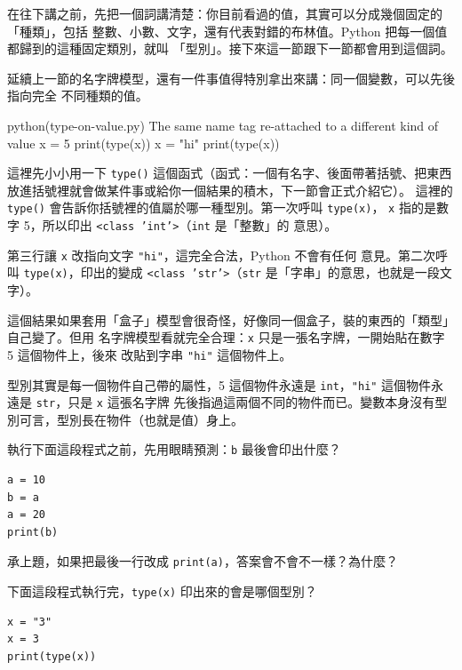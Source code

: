 在往下講之前，先把一個詞講清楚：你目前看過的值，其實可以分成幾個固定的「種類」，包括
整數、小數、文字，還有代表對錯的布林值。Python 把每一個值都歸到的這種固定類別，就叫
「型別」。接下來這一節跟下一節都會用到這個詞。

延續上一節的名字牌模型，還有一件事值得特別拿出來講：同一個變數，可以先後指向完全
不同種類的值。

\begin{example}{python}{(type-on-value.py) The same name tag re-attached to a different kind of value}
x = 5
print(type(x))
x = "hi"
print(type(x))
\end{example}


這裡先小小用一下 \texttt{type()} 這個函式（函式：一個有名字、後面帶著括號、把東西
放進括號裡就會做某件事或給你一個結果的積木，下一節會正式介紹它）。
這裡的
\texttt{type()} 會告訴你括號裡的值屬於哪一種型別。第一次呼叫 \texttt{type(x)}，
\texttt{x} 指的是數字 5，所以印出 \texttt{<class 'int'>}（\texttt{int} 是「整數」的
意思）。

第三行讓 \texttt{x} 改指向文字 \texttt{"hi"}，這完全合法，Python 不會有任何
意見。第二次呼叫 \texttt{type(x)}，印出的變成 \texttt{<class 'str'>}（\texttt{str}
是「字串」的意思，也就是一段文字）。

這個結果如果套用「盒子」模型會很奇怪，好像同一個盒子，裝的東西的「類型」自己變了。但用
名字牌模型看就完全合理：\texttt{x} 只是一張名字牌，一開始貼在數字 5 這個物件上，後來
改貼到字串 \texttt{"hi"} 這個物件上。

型別其實是每一個物件自己帶的屬性，5 這個物件永遠是
\texttt{int}，\texttt{"hi"} 這個物件永遠是 \texttt{str}，只是 \texttt{x} 這張名字牌
先後指過這兩個不同的物件而已。變數本身沒有型別可言，型別長在物件（也就是值）身上。

\begin{drills}[label=drills:name-tags]
\item 執行下面這段程式之前，先用眼睛預測：\texttt{b} 最後會印出什麼？
\begin{verbatim}
a = 10
b = a
a = 20
print(b)
\end{verbatim}
\item 承上題，如果把最後一行改成 \texttt{print(a)}，答案會不會不一樣？為什麼？
\item 下面這段程式執行完，\texttt{type(x)} 印出來的會是哪個型別？
\begin{verbatim}
x = "3"
x = 3
print(type(x))
\end{verbatim}
\end{drills}

